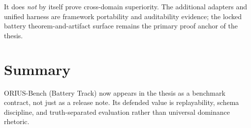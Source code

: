 It does \emph{not} by itself prove cross-domain superiority.  The additional
adapters and unified harness are framework portability and auditability
evidence; the locked battery theorem-and-artifact surface remains the primary
proof anchor of the thesis.

\section{Summary}

ORIUS-Bench (Battery Track) now appears in the thesis as a benchmark
contract, not just as a release note.  Its defended value is replayability,
schema discipline, and truth-separated evaluation rather than universal
dominance rhetoric.
